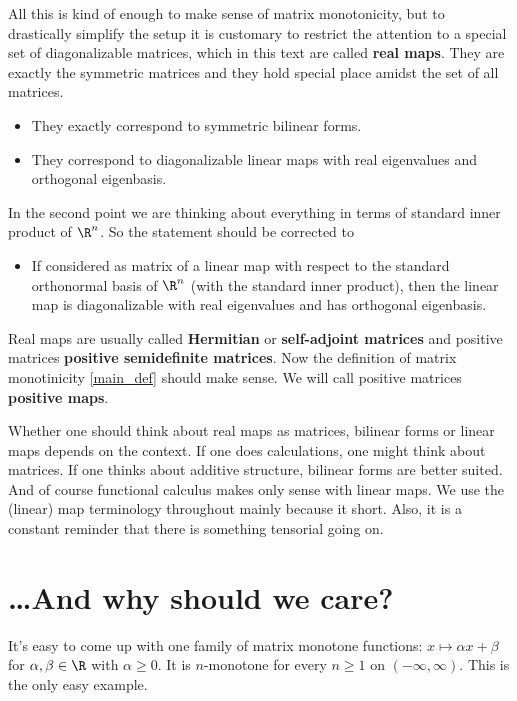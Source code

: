 All this is kind of enough to make sense of matrix monotonicity, but to drastically simplify the setup it is customary to restrict the attention to a special set of diagonalizable matrices, which in this text are called \textbf{real maps}. They are exactly the symmetric matrices and they hold special place amidst the set of all matrices.

\begin{itemize}
	\item They exactly correspond to symmetric bilinear forms.
	\item They correspond to diagonalizable linear maps with real eigenvalues and orthogonal eigenbasis.
\end{itemize}

In the second point we are thinking about everything in terms of standard inner product of $\R^n$. So the statement should be corrected to

\begin{itemize}
	\item If considered as matrix of a linear map with respect to the standard orthonormal basis of $\R^n$ (with the standard inner product), then the linear map is diagonalizable with real eigenvalues and has orthogonal eigenbasis.
\end{itemize}

Real maps are usually called \textbf{Hermitian} or \textbf{self-adjoint matrices} and positive matrices \textbf{positive semidefinite matrices}. Now the definition of matrix monotinicity \ref{main_def} should make sense. We will call positive matrices \textbf{positive maps}.

Whether one should think about real maps as matrices, bilinear forms or linear maps depends on the context. If one does calculations, one might think about matrices. If one thinks about additive structure, bilinear forms are better suited. And of course functional calculus makes only sense with linear maps. We use the (linear) map terminology throughout mainly because it short. Also, it is a constant reminder that there is something tensorial going on.

\section{\ldots And why should we care?}

It's easy to come up with one family of matrix monotone functions: $x \mapsto \alpha x + \beta$ for $\alpha, \beta \in \R$ with $\alpha \geq 0$. It is $n$-monotone for every $n \geq 1$ on $(-\infty, \infty)$. This is the only easy example.

